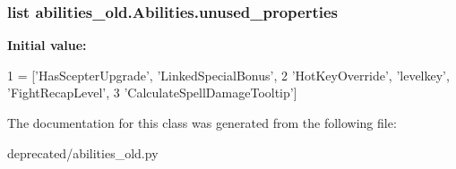 \subsubsection[{\texorpdfstring{unused\+\_\+properties}{unused\_properties}}]{\setlength{\rightskip}{0pt plus 5cm}list abilities\+\_\+old.\+Abilities.\+unused\+\_\+properties\hspace{0.3cm}{\ttfamily [static]}}\hypertarget{classabilities__old_1_1_abilities_a76f031bc5ecabb1948635844ba0a3332}{}\label{classabilities__old_1_1_abilities_a76f031bc5ecabb1948635844ba0a3332}
{\bfseries Initial value\+:}
\begin{DoxyCode}
1 = [\textcolor{stringliteral}{'HasScepterUpgrade'}, \textcolor{stringliteral}{'LinkedSpecialBonus'},
2                          \textcolor{stringliteral}{'HotKeyOverride'}, \textcolor{stringliteral}{'levelkey'}, \textcolor{stringliteral}{'FightRecapLevel'},
3                          \textcolor{stringliteral}{'CalculateSpellDamageTooltip'}]
\end{DoxyCode}


The documentation for this class was generated from the following file\+:\begin{DoxyCompactItemize}
\item 
deprecated/abilities\+\_\+old.\+py\end{DoxyCompactItemize}
